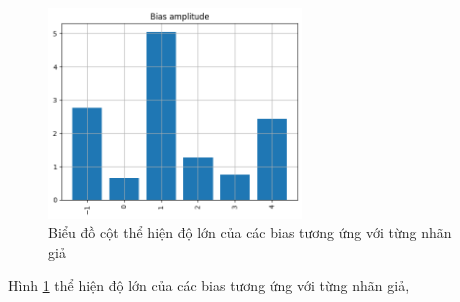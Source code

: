\begin{enumerate}[label=(\alph*)]
    \begin{figure}[H]
        \centering
        \includegraphics[width=0.6\textwidth]{figures/Thanh/Data_Analysis/Non_null_Bias_Importance_Logistic_PCA_features.png}
        \caption{Biểu đồ cột thể hiện độ lớn của các bias tương ứng với từng nhãn giả}
        \label{fig:Non_null_Bias_Importance_Logistic_PCA_features}
    \end{figure}

    Hình \ref{fig:Non_null_Bias_Importance_Logistic_PCA_features} thể hiện độ lớn của các bias tương ứng với từng nhãn giả,
\end{enumerate}